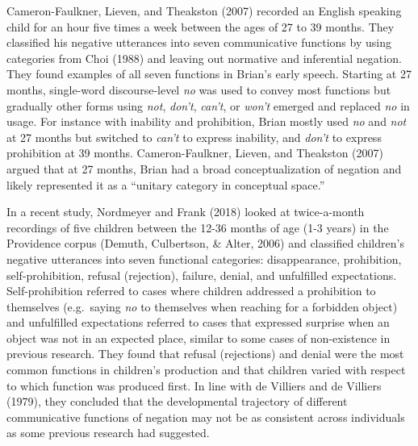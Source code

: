 \documentclass[
  english,
  man,floatsintext]{apa6}
\begin{document}
Cameron-Faulkner, Lieven, and Theakston (2007) recorded an English speaking child for an hour five times a week between the ages of 27 to 39 months. They classified his negative utterances into seven communicative functions by using categories from Choi (1988) and leaving out normative and inferential negation. They found examples of all seven functions in Brian's early speech. Starting at 27 months, single-word discourse-level \emph{no} was used to convey most functions but gradually other forms using \emph{not}, \emph{don't}, \emph{can't}, or \emph{won't} emerged and replaced \emph{no} in usage. For instance with inability and prohibition, Brian mostly used \emph{no} and \emph{not} at 27 months but switched to \emph{can't} to express inability, and \emph{don't} to express prohibition at 39 months. Cameron-Faulkner, Lieven, and Theakston (2007) argued that at 27 months, Brian had a broad conceptualization of negation and likely represented it as a ``unitary category in conceptual space.''

In a recent study, Nordmeyer and Frank (2018) looked at twice-a-month recordings of five children between the 12-36 months of age (1-3 years) in the Providence corpus (Demuth, Culbertson, \& Alter, 2006) and classified children's negative utterances into seven functional categories: disappearance, prohibition, self-prohibition, refusal (rejection), failure, denial, and unfulfilled expectations. Self-prohibition referred to cases where children addressed a prohibition to themselves (e.g.~saying \emph{no} to themselves when reaching for a forbidden object) and unfulfilled expectations referred to cases that expressed surprise when an object was not in an expected place, similar to some cases of non-existence in previous research. They found that refusal (rejections) and denial were the most common functions in children's production and that children varied with respect to which function was produced first. In line with de Villiers and de Villiers (1979), they concluded that the developmental trajectory of different communicative functions of negation may not be as consistent across individuals as some previous research had suggested.
\end{document}
